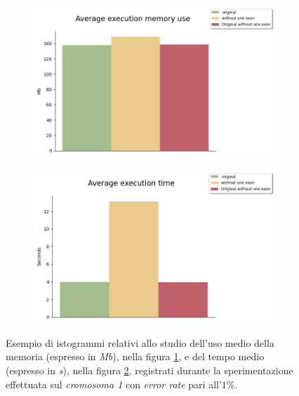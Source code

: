 \documentclass[a4paper,12pt, oneside]{book}
\begin{document}
\begin{figure}
  \begin{subfigure}{.5\textwidth}
    \centering
    \includegraphics[scale = 0.39]{img/mems1.png}
    \caption{}
    \label{img:ista}
  \end{subfigure}
  \begin{subfigure}{.5\textwidth}
    \centering
    \includegraphics[scale = 0.39]{img/times1.png}
    \caption{}
    \label{img:istb}
  \end{subfigure}
   \caption{Esempio di istogrammi relativi allo studio dell'uso medio della
    memoria (espresso in \emph{Mb}), nella figura \ref{img:ista}, e del tempo
    medio (espresso in \emph{s}), nella figura \ref{img:istb}, registrati
    durante la sperimentazione effettuata sul\emph{ cromosoma 1} con
    \textit{error rate} pari all'$1\%$.}
  \label{perf}
\end{figure}
\end{document}
